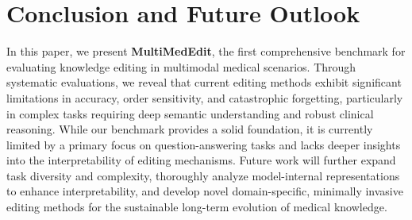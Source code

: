 \documentclass[letterpaper]{article} %
\begin{document}
\section{Conclusion and Future Outlook}
In this paper, we present \textbf{MultiMedEdit}, the first comprehensive benchmark for evaluating knowledge editing in multimodal medical scenarios. Through systematic evaluations, we reveal that current editing methods exhibit significant limitations in accuracy, order sensitivity, and catastrophic forgetting, particularly in complex tasks requiring deep semantic understanding and robust clinical reasoning. While our benchmark provides a solid foundation, it is currently limited by a primary focus on question-answering tasks and lacks deeper insights into the interpretability of editing mechanisms. Future work will further expand task diversity and complexity, thoroughly analyze model-internal representations to enhance interpretability, and develop novel domain-specific, minimally invasive editing methods for the sustainable long-term evolution of medical knowledge.







\end{document}
